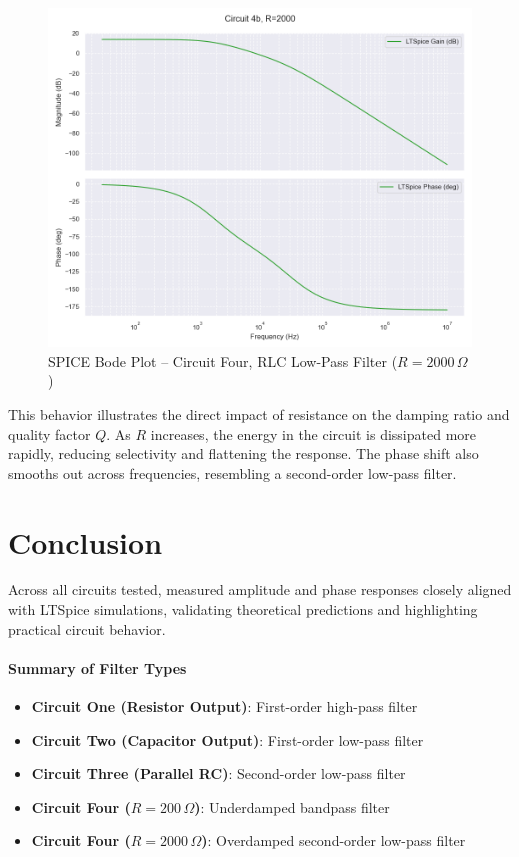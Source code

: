 \documentclass[12pt]{article}
\begin{document}
\begin{figure}[H]
	\centering
	\includegraphics[width=\textwidth]{e6_bode5}
	\caption{SPICE Bode Plot – Circuit Four, RLC Low-Pass Filter ($R = 2000\,\Omega$)}
	\label{fig:rlc_lp}
\end{figure}

This behavior illustrates the direct impact of resistance on the damping ratio and quality factor \( Q \). As $R$ increases, the energy in the circuit is dissipated more rapidly, reducing selectivity and flattening the response. The phase shift also smooths out across frequencies, resembling a second-order low-pass filter.

\section{Conclusion}

Across all circuits tested, measured amplitude and phase responses closely aligned with LTSpice simulations, validating theoretical predictions and highlighting practical circuit behavior.

\paragraph{Summary of Filter Types}
\begin{itemize}
	\item \textbf{Circuit One (Resistor Output)}: First-order high-pass filter
	\item \textbf{Circuit Two (Capacitor Output)}: First-order low-pass filter
	\item \textbf{Circuit Three (Parallel RC)}: Second-order low-pass filter
	\item \textbf{Circuit Four ($R = 200\,\Omega$)}: Underdamped bandpass filter
	\item \textbf{Circuit Four ($R = 2000\,\Omega$)}: Overdamped second-order low-pass filter
\end{itemize}
\end{document}
